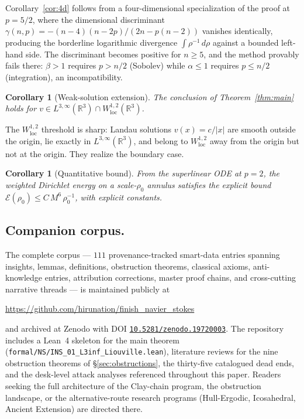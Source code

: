 \documentclass[11pt]{amsart}
\newtheorem{corollary}[theorem]{Corollary}
\theoremstyle{definition}
\newcommand{\RR}{\mathbb{R}}
\newcommand{\EE}{\mathcal{E}}    %
\newcommand{\abs}[1]{|#1|}
\newcommand{\loc}{\mathrm{loc}}
\begin{document}
Corollary~\ref{cor:4d} follows from a four-dimensional
specialization of the proof at $p = 5/2$, where the dimensional
discriminant $\gamma(n, p) = -(n-4)(n-2p)/(2n - p(n-2))$ vanishes
identically, producing the borderline logarithmic divergence
$\int \rho^{-1}\,d\rho$ against a bounded left-hand side. The
discriminant becomes positive for $n \geq 5$, and the method
provably fails there: $\beta > 1$ requires $p > n/2$ (Sobolev)
while $\alpha \leq 1$ requires $p \leq n/2$ (integration), an
incompatibility.

\begin{corollary}[Weak-solution extension]\label{cor:weak}
The conclusion of Theorem~\ref{thm:main} holds for
$v \in L^{3,\infty}(\RR^3) \cap W^{1,2}_\loc(\RR^3)$.
\end{corollary}

The $W^{1,2}_\loc$ threshold is sharp: Landau solutions
$v(x) = c/\abs{x}$ are smooth outside the origin, lie exactly in
$L^{3,\infty}(\RR^3)$, and belong to $W^{1,2}_\loc$ away from the
origin but not at the origin. They realize the boundary case.

\begin{corollary}[Quantitative bound]\label{cor:quant}
From the superlinear ODE at $p = 2$, the weighted Dirichlet
energy on a scale-$\rho_0$ annulus satisfies the explicit bound
$\EE(\rho_0) \leq C\,M^6\,\rho_0^{-1}$, with explicit constants.
\end{corollary}

\subsection{Companion corpus.}\label{ssec:companion}
The complete corpus --- $111$ provenance-tracked smart-data
entries spanning insights, lemmas, definitions, obstruction
theorems, classical axioms, anti-knowledge entries, attribution
corrections, master proof chains, and cross-cutting narrative
threads --- is maintained publicly at
\begin{center}
\url{https://github.com/hirunation/finish_navier_stokes}
\end{center}
and archived at Zenodo with DOI
\href{https://doi.org/10.5281/zenodo.19720003}{\texttt{10.5281/zenodo.19720003}}.
The repository includes a Lean~4 skeleton for the main theorem
(\texttt{formal/NS/INS\_01\_L3inf\_Liouville.lean}), literature
reviews for the nine obstruction theorems of
\S\ref{sec:obstructions}, the thirty-five catalogued dead ends,
and the desk-level attack analyses referenced throughout this
paper. Readers seeking the full architecture of the Clay-chain
program, the obstruction landscape, or the alternative-route
research programs (Hull-Ergodic, Icosahedral, Ancient Extension)
are directed there.
\end{document}
